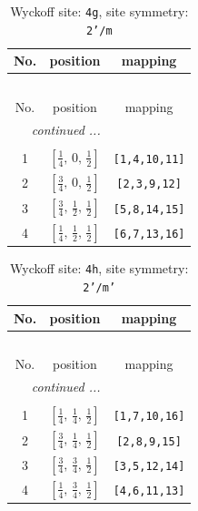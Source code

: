 \documentclass[fleqn,8pt]{jsarticle}
\begin{document}
\renewcommand{\arraystretch}{1.2}
\begin{longtable}{ccc}
\caption{Wyckoff site: {\tt 4g}, site symmetry: {\tt 2'/m}}
 \\
 \hline \hline
No. & position & mapping \\ \hline \endfirsthead

\multicolumn{2}{l}{\tablename\ \thetable{}} \\
 \hline \hline
No. & position & mapping \\ \hline \endhead

 \hline \hline
\multicolumn{2}{r}{\footnotesize\it continued ...} \\ \endfoot

 \hline \hline
\multicolumn{2}{r}{} \\ \endlastfoot

1 & $\left[ \frac{1}{4},\, 0,\, \frac{1}{2} \right]$ & {\tt [1,4,10,11]} \\ \hline
2 & $\left[ \frac{3}{4},\, 0,\, \frac{1}{2} \right]$ & {\tt [2,3,9,12]} \\ \hline
3 & $\left[ \frac{3}{4},\, \frac{1}{2},\, \frac{1}{2} \right]$ & {\tt [5,8,14,15]} \\ \hline
4 & $\left[ \frac{1}{4},\, \frac{1}{2},\, \frac{1}{2} \right]$ & {\tt [6,7,13,16]} \\
\end{longtable}
\renewcommand{\arraystretch}{1.2}
\begin{longtable}{ccc}
\caption{Wyckoff site: {\tt 4h}, site symmetry: {\tt 2'/m'}}
 \\
 \hline \hline
No. & position & mapping \\ \hline \endfirsthead

\multicolumn{2}{l}{\tablename\ \thetable{}} \\
 \hline \hline
No. & position & mapping \\ \hline \endhead

 \hline \hline
\multicolumn{2}{r}{\footnotesize\it continued ...} \\ \endfoot

 \hline \hline
\multicolumn{2}{r}{} \\ \endlastfoot

1 & $\left[ \frac{1}{4},\, \frac{1}{4},\, \frac{1}{2} \right]$ & {\tt [1,7,10,16]} \\ \hline
2 & $\left[ \frac{3}{4},\, \frac{1}{4},\, \frac{1}{2} \right]$ & {\tt [2,8,9,15]} \\ \hline
3 & $\left[ \frac{3}{4},\, \frac{3}{4},\, \frac{1}{2} \right]$ & {\tt [3,5,12,14]} \\ \hline
4 & $\left[ \frac{1}{4},\, \frac{3}{4},\, \frac{1}{2} \right]$ & {\tt [4,6,11,13]} \\
\end{longtable}
\end{document}
